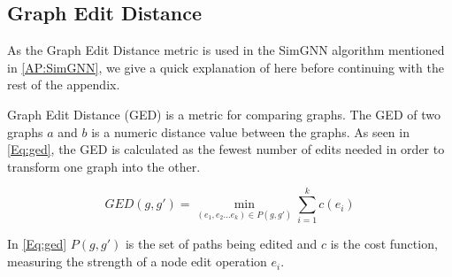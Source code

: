 \subsection{Graph Edit Distance}\label{Subsec:GED}
As the Graph Edit Distance metric is used in the SimGNN algorithm mentioned in \autoref{AP:SimGNN}, we give a quick explanation of here before continuing with the rest of the appendix.

Graph Edit Distance (GED) is a metric for comparing graphs. The GED of two graphs $a$ and $b$ is a numeric distance value between the graphs. As seen in \autoref{Eq:ged}, the GED is calculated as the fewest number of edits needed in order to transform one graph into the other\cite{Riesen2015}.

\begin{equation}\label{Eq:ged}
 GED(g,g') = \min_{(e_1,e_2 \dots e_k) \in P(g, g') } \sum_{i=1}^k c(e_i)
\end{equation}

In \autoref{Eq:ged} $P(g,g')$ is the set of paths being edited and $c$ is the cost function, measuring the strength of a node edit operation $e_i$\cite{Riesen2015}.
